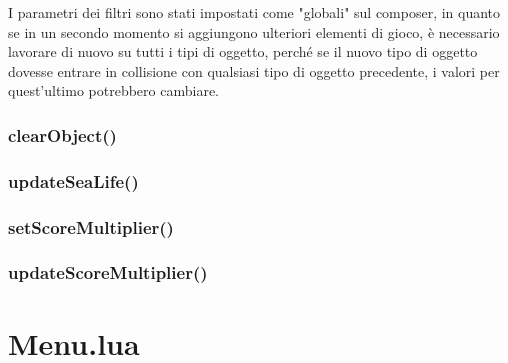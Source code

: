 \documentclass[12pt]{article}
\begin{document}
I parametri dei filtri sono stati impostati come "globali" sul composer, in quanto se in un secondo momento si aggiungono ulteriori 
elementi di gioco, è necessario lavorare di nuovo su tutti i tipi di oggetto, perché se il nuovo tipo di oggetto dovesse entrare in 
collisione con qualsiasi tipo di oggetto precedente, i valori per quest'ultimo potrebbero cambiare. 


\subsubsection{clearObject()}

\subsubsection{updateSeaLife()}

\subsubsection{setScoreMultiplier()}

\subsubsection{updateScoreMultiplier()}

\section{Menu.lua}
\end{document}
